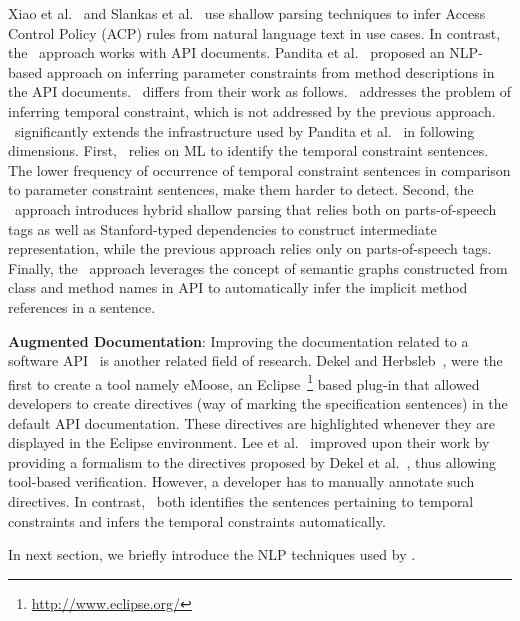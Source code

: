 Xiao et al.~\cite{XiaoFSE2012} and Slankas et al.~\cite{johnSlankasPASSAT13} use shallow parsing techniques to infer Access Control Policy (ACP) rules from natural language text in use cases. In contrast, the \tool\ approach works with API documents.
Pandita et al.~\cite{pandita12:inferring} proposed an NLP-based approach on inferring parameter constraints from method descriptions in the API documents. \tool\ differs from their work as follows.
\tool\ addresses the problem of inferring temporal constraint, which is not addressed by the previous approach. \tool\ significantly extends the infrastructure used by Pandita et al.~\cite{pandita12:inferring} in following dimensions.
First, \tool\ relies on ML to identify the temporal constraint sentences. The lower frequency of occurrence of temporal constraint sentences in comparison to parameter constraint sentences, make them harder to detect.
Second, the \tool\ approach introduces hybrid shallow parsing that relies both on parts-of-speech tags as well as Stanford-typed dependencies to construct intermediate representation, while the previous approach relies only on parts-of-speech tags.
Finally, the \tool\ approach leverages the concept of semantic graphs constructed from class and method names in API to automatically infer the implicit method references in a sentence. 


\textbf{Augmented Documentation}:
Improving the documentation related to a software API~\cite{Dekel2009,tan2011acomment} is another related field of research.
Dekel and Herbsleb~\cite{Dekel2009}, were the first to create a tool namely eMoose,
an Eclipse~\footnote{\url{http://www.eclipse.org/}} based plug-in that allowed developers to create directives
(way of marking the specification sentences) in the default API documentation.
These directives are highlighted whenever they are displayed in the Eclipse environment.
Lee et al.~\cite{lee2012towards} improved upon their work by providing a formalism to the directives proposed by Dekel et al.~\cite{Dekel2009},
thus allowing tool-based verification.
However, a developer has to manually annotate such directives.
In contrast, \tool\ both identifies the sentences pertaining to temporal constraints and infers the temporal constraints automatically. 

In next section, we briefly introduce the NLP techniques used by \tool.